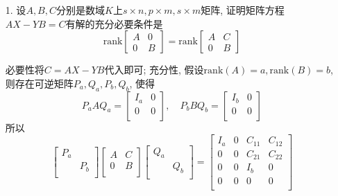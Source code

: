 \begin{itemize}
	\item[1.] 设$A,B,C$分别是数域$K$上$s\times n, p\times m, s\times m$矩阵,
	证明矩阵方程$AX-YB=C$有解的充分必要条件是
	\begin{equation}
	\nonumber
	\mathrm{rank}
	\begin{bmatrix}
		A&0\\
		0&B
	\end{bmatrix}
	=
	\mathrm{rank}
	\begin{bmatrix}
		A&C\\
		0&B
	\end{bmatrix}
	\end{equation}
	\begin{solution}
		必要性将$C=AX-YB$代入即可; 充分性,
		假设$\mathrm{rank}(A)=a, \mathrm{rank}(B)=b$,
		则存在可逆矩阵$P_a, Q_a, P_b, Q_b$, 使得
		\begin{equation*}
			P_a A Q_a = \begin{bmatrix}
				I_a&0\\
				0&0\\
			\end{bmatrix},\quad
			P_b B Q_b = \begin{bmatrix}
				I_b&0\\
				0&0\\
			\end{bmatrix}
		\end{equation*}
		所以
		\begin{equation*}
		\begin{bmatrix}
			P_a&\\
			&P_b\\
		\end{bmatrix}
		\begin{bmatrix}
			A&C\\
			0&B\\
		\end{bmatrix}
		\begin{bmatrix}
			Q_a&\\
			&Q_b\\
		\end{bmatrix}
		=
		\begin{bmatrix}
			I_a&0& C_{11}& C_{12}\\
			0&0& C_{21}& C_{22}\\
			0&0& I_b& 0\\
			0&0& 0& 0\\
		\end{bmatrix}
		\end{equation*}

\end{solution}
\end{itemize}

